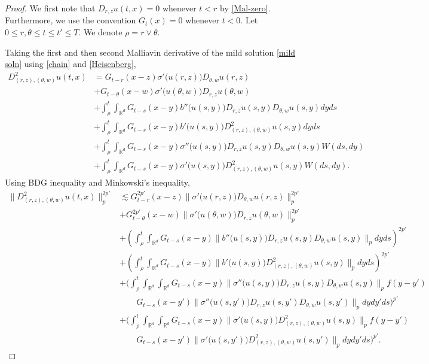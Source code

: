 \documentclass[10pt,a4paper]{amsart}
\def\bR{\mathbb{R}}
\newcommand{\les}{\lesssim}
\def\s{\sigma}
\begin{document}
\begin{proof}
We first note that $D_{r,z}u(t,x) = 0$ whenever $t < r$ by \eqref{Mal-zero}. Furthermore, we use the convention $G_t(x) = 0$ whenever $t < 0$. Let $0\leq r,\theta \leq t \leq t' \leq T$. We denote $\rho = r \vee \theta$.

Taking the first and then second Malliavin derivative of the mild solution \eqref{mild soln} using \eqref{chain} and \eqref{Heisenberg}, 
\begin{align*}
D^2_{(r,z),(\theta,w)}u(t,x) & =  G_{t-r}(x-z) \s'\big(u(r,z)\big) D_{\theta,w} u(r,z) \\
& + G_{t-\theta}(x-w) \s'\big(u(\theta,w)\big) D_{r,z} u(\theta,w) \\
& + \int_\rho^t \int_{\bR^d} G_{t-s}(x-y) b''\big(u(s,y)\big) D_{r,z}u(s,y) D_{\theta,w}u(s,y)  dyds \\
& + \int_\rho^t \int_{\bR^d} G_{t-s}(x-y) b'\big(u(s,y)\big) D_{(r,z),(\theta,w)}^2 u(s,y) dyds \\
& + \int_\rho^t \int_{\bR^d} G_{t-s}(x-y) \s''\big(u(s,y)\big) D_{r,z}u(s,y) D_{\theta,w}u(s,y)  W(ds,dy)\\
& + \int_\rho^t \int_{\bR^d} G_{t-s}(x-y) \s'\big(u(s,y)\big) D_{(r,z),(\theta,w)}^2 u(s,y) W(ds,dy).
\end{align*}
Using BDG inequality and Minkowski's inequality,
\begin{align*}
\|D^2_{(r,z),(\theta,w)}u(t,x)\|_p^{2p'} & \les  G^{2p'}_{t-r}(x-z) \|\s'\big(u(r,z)\big) D_{\theta,w} u(r,z)\|_p^{2p'} \\
& + G^{2p'}_{t-\theta}(x-w) \|\s'\big(u(\theta,w)\big) D_{r,z} u(\theta,w)\|_p^{2p'} \\
& + \left(\int_\rho^t \int_{\bR^d} G_{t-s}(x-y) \|b''\big(u(s,y)\big) D_{r,z}u(s,y) D_{\theta,w}u(s,y)\|_p  dyds\right)^{2p'} \\
& + \left(\int_\rho^t \int_{\bR^d} G_{t-s}(x-y) \|b'\big(u(s,y)\big) D_{(r,z),(\theta,w)}^2 u(s,y)\|_p dyds\right)^{2p'} \\
& + \bigg(\int_\rho^t \int_{\bR^d} \int_{\bR^d} G_{t-s}(x-y) \|\s''\big(u(s,y)\big) D_{r,z}u(s,y) D_{\theta,w}u(s,y)\|_p f(y-y')  \\
& \qquad G_{t-s}(x-y') \|\s''\big(u(s,y')\big) D_{r,z}u(s,y') D_{\theta,w}u(s,y')\|_p dy dy' ds \bigg)^{p'}\\
& + \bigg( \int_\rho^t \int_{\bR^d} \int_{\bR^d} G_{t-s}(x-y) \|\s'\big(u(s,y)\big) D_{(r,z),(\theta,w)}^2 u(s,y)\|_pf(y-y')  \\
& \qquad G_{t-s}(x-y') \|\s'\big(u(s,y')\big) D_{(r,z),(\theta,w)}^2 u(s,y')\|_p dy dy' ds \bigg)^{p'}.

\end{align*}
\end{proof}
\end{document}
